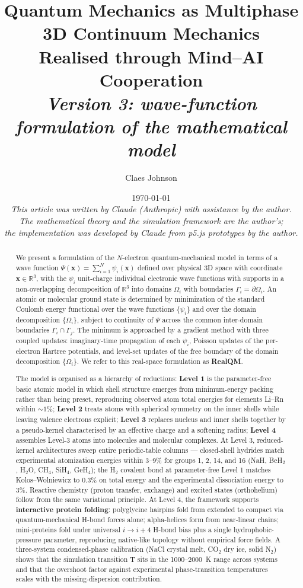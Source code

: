 \documentclass[11pt]{article}
\title{Quantum Mechanics as Multiphase 3D Continuum Mechanics \\[0.2em]
\large Realised through Mind--AI Cooperation \\[0.3em]
\normalsize\textit{Version 3: wave-function formulation of the mathematical model}}
\author[1]{Claes Johnson}
\affil[1]{KTH Royal Institute of Technology, Stockholm, Sweden \\
\texttt{claesjohnson@gmail.com}}
\date{\today \\[0.5em]
\textit{This article was written by Claude (Anthropic) with assistance by the author.} \\
\textit{The mathematical theory and the simulation framework are the author's;} \\
\textit{the implementation was developed by Claude from p5.js prototypes by the author.}}
\begin{document}
\maketitle

\begin{abstract}
We present a formulation of the $N$-electron quantum-mechanical model in terms of a wave function $\Psi(\mathbf{x}) = \sum_{i=1}^{N} \psi_i(\mathbf{x})$ defined over physical 3D space with coordinate $\mathbf{x} \in \mathbb{R}^3$, with the $\psi_i$ unit-charge individual electronic wave functions with supports in a non-overlapping decomposition of $\mathbb{R}^3$ into domains $\Omega_i$ with boundaries $\Gamma_i = \partial \Omega_i$. An atomic or molecular ground state is determined by minimization of the standard Coulomb energy functional over the wave functions $\{\psi_i\}$ and over the domain decomposition $\{\Omega_i\}$, subject to continuity of $\Psi$ across the common inter-domain boundaries $\Gamma_i \cap \Gamma_j$. The minimum is approached by a gradient method with three coupled updates: imaginary-time propagation of each $\psi_i$, Poisson updates of the per-electron Hartree potentials, and level-set updates of the free boundary of the domain decomposition $\{\Omega_i\}$. We refer to this real-space formulation as \textbf{RealQM}.

The model is organised as a hierarchy of reductions: \textbf{Level 1} is the parameter-free basic atomic model in which shell structure emerges from minimum-energy packing rather than being preset, reproducing observed atom total energies for elements Li--Rn within ${\sim}1\%$; \textbf{Level 2} treats atoms with spherical symmetry on the inner shells while leaving valence electrons explicit; \textbf{Level 3} replaces nucleus and inner shells together by a pseudo-kernel characterised by an effective charge and a softening radius; \textbf{Level 4} assembles Level-3 atoms into molecules and molecular complexes. At Level 3, reduced-kernel architectures sweep entire periodic-table columns --- closed-shell hydrides match experimental atomization energies within 3--9\% for groups 1, 2, 14, and 16 (NaH, BeH$_2$, H$_2$O, CH$_4$, SiH$_4$, GeH$_4$); the H$_2$ covalent bond at parameter-free Level 1 matches Kolos--Wolniewicz to 0.3\% on total energy and the experimental dissociation energy to 3\%. Reactive chemistry (proton transfer, exchange) and excited states (orthohelium) follow from the same variational principle. At Level 4, the framework supports \textbf{interactive protein folding}: polyglycine hairpins fold from extended to compact via quantum-mechanical H-bond forces alone; alpha-helices form from near-linear chains; mini-proteins fold under universal $i \to i{+}4$ H-bond bias plus a single hydrophobic-pressure parameter, reproducing native-like topology without empirical force fields. A three-system condensed-phase calibration (NaCl crystal melt, CO$_2$ dry ice, solid N$_2$) shows that the simulation transition T sits in the 1000--2000~K range across systems and that the overshoot factor against experimental phase-transition temperatures scales with the missing-dispersion contribution.


\end{abstract}
\end{document}

